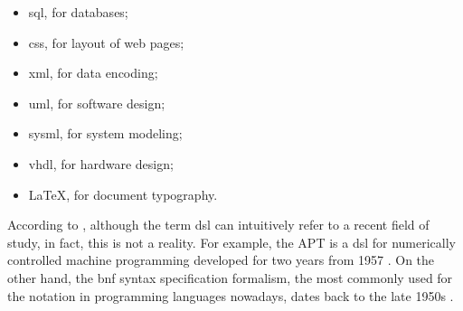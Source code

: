 \begin{itemize}
     \item \ac{sql}, for databases;
     \item \ac{css}, for layout of web pages;
     \item \ac{xml}, for data encoding;
     \item \ac{uml}, for software design;
     \item \ac{sysml}, for system modeling;
     \item \ac{vhdl}, for hardware design;
     \item \LaTeX, for document typography.
\end{itemize}

According to \cite{Faveri:2013}, although the term \ac{dsl} can intuitively refer to a recent field of study, in fact, this is not a reality.
For example, the APT is a \ac{dsl} for numerically controlled machine programming developed for two years from 1957 \cite{Ross:1978}. 
On the other hand, the \ac{bnf} syntax specification formalism, the most commonly used for the notation in programming languages nowadays, dates back to the late 1950s \cite{Backus:1959}.
    
